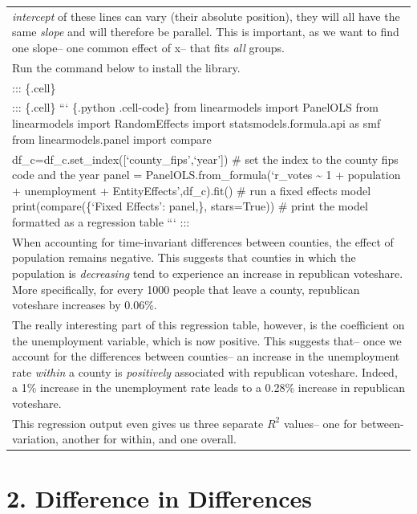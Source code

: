 \documentclass[
  letterpaper,
  DIV=11,
  numbers=noendperiod]{scrreprt}
\begin{document}
\begin{longtable}[]{@{}
  >{\raggedright\arraybackslash}p{}@{}}
\emph{intercept} of these lines can vary (their absolute position), they
will all have the same \emph{slope} and will therefore be parallel. This
is important, as we want to find one slope-- one common effect of x--
that fits \emph{all} groups. \\
Run the command below to install the library. \\
::: \{.cell\} \\
::: \{.cell\} ``` \{.python .cell-code\} from linearmodels import
PanelOLS from linearmodels import RandomEffects import
statsmodels.formula.api as smf from linearmodels.panel import compare \\
df\_c=df\_c.set\_index({[}`county\_fips',`year'{]}) \# set the index to
the county fips code and the year panel =
PanelOLS.from\_formula(`r\_votes \textasciitilde{} 1 + population +
unemployment + EntityEffects',df\_c).fit() \# run a fixed effects model
print(compare(\{`Fixed Effects': panel,\}, stars=True)) \# print the
model formatted as a regression table ``` ::: \\
When accounting for time-invariant differences between counties, the
effect of population remains negative. This suggests that counties in
which the population is \emph{decreasing} tend to experience an increase
in republican voteshare. More specifically, for every 1000 people that
leave a county, republican voteshare increases by 0.06\%. \\
The really interesting part of this regression table, however, is the
coefficient on the unemployment variable, which is now positive. This
suggests that-- once we account for the differences between counties--
an increase in the unemployment rate \emph{within} a county is
\emph{positively} associated with republican voteshare. Indeed, a 1\%
increase in the unemployment rate leads to a 0.28\% increase in
republican voteshare. \\
This regression output even gives us three separate \(R^2\) values-- one
for between-variation, another for within, and one overall. \\
\end{longtable}

\hypertarget{difference-in-differences-1}{%
\section{2. Difference in
Differences}\label{difference-in-differences-1}}
\end{document}
